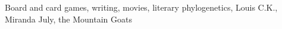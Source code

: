 \documentclass[margin, 10pt]{res} %
\begin{document}
\begin{resume}
Board and card games, writing, movies, literary phylogenetics, Louis C.K., Miranda July, the Mountain Goats

%
%
%
%
%


\end{resume}
\end{document}
